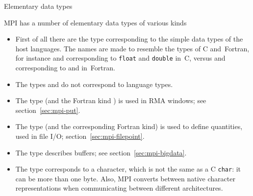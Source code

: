 
 {Elementary data types}
\label{sec:elementary}

MPI has a number of elementary data types of various kinds
\begin{itemize}
\item First of all there are the type corresponding to the 
  simple data types of the host languages.
  The names are made to resemble the types of C and~Fortran, 
  for instance  and 
  corresponding to \lstinline{float} and \lstinline{double} in~C,
  versus
   and 
  corresponding to  and 
  in~Fortran.
\item The types  and 
  do not correspond to language types.
\item The type 
  (and the Fortran kind )
  is used in \ac{RMA} windows; see section~\ref{sec:mpi-put}.
\item The type 
  (and the corresponding Fortran  kind)
  is used to define  quantities,
  used in file I/O; section~\ref{sec:mpi-filepoint}.
\item The type  describes buffers;
  see section~\ref{sec:mpi-bigdata}.
\item The type  corresponds to a character, which
  is not the same as a C \lstinline{char}: it can be more than one byte.
  Also, MPI converts between native character representations when communicating
  between different architectures.
\end{itemize}

\begin{comment}
  MPI calls accept arrays of elements:
  \begin{lstlisting}
    double x[20];
    MPI_Send( x,20,MPI_DOUBLE, ..... )
  \end{lstlisting}
  so for a single element you need to take its address:
  \begin{lstlisting}
    double x;
    MPI_Send( &x,1,MPI_DOUBLE, ..... )
  \end{lstlisting}
\end{comment}

